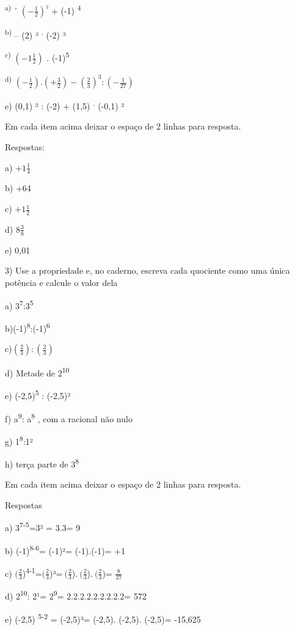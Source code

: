 \textsuperscript{a)~-} \(( - \frac{1}{2})\)\textsuperscript{²} + (-1)
\textsuperscript{4}

\textsuperscript{b)} -- (2) ³ \textsuperscript{.} (-2) ³

\textsuperscript{c)} \(( - 1\frac{1}{2})\) . (-1)\textsuperscript{5}

\textsuperscript{d)}
\(\left( - \frac{1}{2} \right).\left( + \frac{3}{2} \right) - \left( \frac{2}{3} \right)^{3}:( - \frac{1}{27})\ \)

e) (0,1) ² : (-2) + (1,5) \textsuperscript{.} (-0,1) ²

Em cada item acima deixar o espaço de 2 linhas para resposta.

Respostas:

a) \(+ 1\frac{1}{4}\)

b) +64

c) \(+ 1\frac{1}{2}\)

d) 8\(\frac{3}{8}\)

e) 0,01

3) Use a propriedade e, no caderno, escreva cada quociente como uma
única potência e calcule o valor dela

a) 3\textsuperscript{7}:3\textsuperscript{5}

b)(-1)\textsuperscript{8}:(-1)\textsuperscript{6}

c)\(\left( \frac{2}{3} \right):\left( \frac{2}{3} \right)\)

d) Metade de 2\textsuperscript{10}

e) (-2,5)\textsuperscript{5} : (-2,5)²

f) a\textsuperscript{9}: a\textsuperscript{8} , com a racional não nulo

g) 1\textsuperscript{8}:1²

h) terça parte de 3\textsuperscript{8}

Em cada item acima deixar o espaço de 2 linhas para resposta.

Respostas

a) 3\textsuperscript{7-5}=3² = 3.3= 9

b) (-1)\textsuperscript{8-6}= (-1)²= (-1).(-1)= +1

c)
\((\frac{2}{3}\))\textsuperscript{4-1}=\((\frac{2}{3}\))³=\(\ (\frac{2}{3}\)).\(\ (\frac{2}{3}\)).\(\ (\frac{2}{3}\))=
\(\frac{8}{27}\)

d) 2\textsuperscript{10}: 2¹= 2\textsuperscript{9}= 2.2.2.2.2.2.2.2.2=
572

e) (-2,5) \textsuperscript{5-2} = (-2,5)³= (-2,5). (-2,5). (-2,5)=
-15,625

